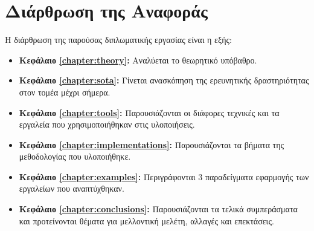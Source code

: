 \section{Διάρθρωση της Αναφοράς}
\label{section:layout}

Η διάρθρωση της παρούσας διπλωματικής εργασίας είναι η εξής:

\begin{itemize}
	\item{\textbf{Κεφάλαιο \ref{chapter:theory}:} Αναλύεται το θεωρητικό υπόβαθρο. 
	}
	\item{\textbf{Κεφάλαιο \ref{chapter:sota}:} Γίνεται ανασκόπηση της ερευνητικής δραστηριότητας στον τομέα μέχρι σήμερα.
	}
	\item{\textbf{Κεφάλαιο \ref{chapter:tools}:} Παρουσιάζονται οι διάφορες τεχνικές και τα εργαλεία που χρησιμοποιήθηκαν στις υλοποιήσεις.
	}
	\item{\textbf{Κεφάλαιο \ref{chapter:implementations}:} Παρουσιάζονται τα βήματα της μεθοδολογίας που υλοποιήθηκε.
	}
	\item{\textbf{Κεφάλαιο \ref{chapter:examples}:} Περιγράφονται 3 παραδείγματα εφαρμογής των εργαλείων που αναπτύχθηκαν.
	}
	\item{\textbf{Κεφάλαιο \ref{chapter:conclusions}:} Παρουσιάζονται τα τελικά συμπεράσματα και προτείνονται θέματα για μελλοντική μελέτη, αλλαγές και επεκτάσεις.
	}

\end{itemize}

